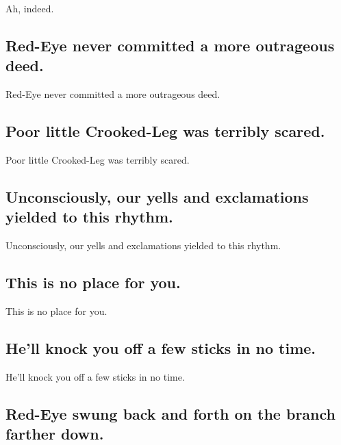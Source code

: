 \documentclass[]{article}
\begin{document}
Ah, indeed.

\hypertarget{red-eye-never-committed-a-more-outrageous-deed.}{%
\subsection{Red-Eye never committed a more outrageous
deed.}\label{red-eye-never-committed-a-more-outrageous-deed.}}

Red-Eye never committed a more outrageous deed.

\hypertarget{poor-little-crooked-leg-was-terribly-scared.}{%
\subsection{Poor little Crooked-Leg was terribly
scared.}\label{poor-little-crooked-leg-was-terribly-scared.}}

Poor little Crooked-Leg was terribly scared.

\hypertarget{unconsciously-our-yells-and-exclamations-yielded-to-this-rhythm.}{%
\subsection{Unconsciously, our yells and exclamations yielded to this
rhythm.}\label{unconsciously-our-yells-and-exclamations-yielded-to-this-rhythm.}}

Unconsciously, our yells and exclamations yielded to this rhythm.

\hypertarget{this-is-no-place-for-you.}{%
\subsection{This is no place for you.}\label{this-is-no-place-for-you.}}

This is no place for you.

\hypertarget{hell-knock-you-off-a-few-sticks-in-no-time.}{%
\subsection{He'll knock you off a few sticks in no
time.}\label{hell-knock-you-off-a-few-sticks-in-no-time.}}

He'll knock you off a few sticks in no time.

\hypertarget{red-eye-swung-back-and-forth-on-the-branch-farther-down.}{%
\subsection{Red-Eye swung back and forth on the branch farther
down.}\label{red-eye-swung-back-and-forth-on-the-branch-farther-down.}}
\end{document}
